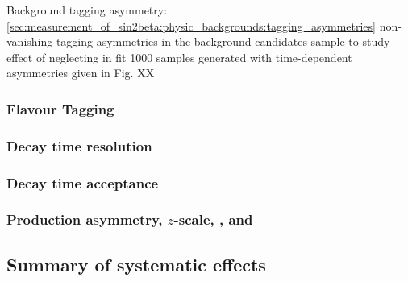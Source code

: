 Background tagging asymmetry:
\cf \cref{sec:measurement_of_sin2beta:physic_backgrounds:tagging_asymmetries}
non-vanishing tagging asymmetries in the background candidates sample
\ToyMC to study effect of neglecting in fit
1000 samples generated with time-dependent asymmetries given in Fig. XX

\subsubsection{Flavour Tagging}
\label{sec:measurement_of_sin2beta:systematics:systematics:tagging}

\subsubsection{Decay time resolution}
\label{sec:measurement_of_sin2beta:systematics:systematics:resolution}

\subsubsection{Decay time acceptance}
\label{sec:measurement_of_sin2beta:systematics:systematics:acceptance}

\subsubsection{Production asymmetry, $z$-scale, \DMd, and \DG}
\label{sec:measurement_of_sin2beta:systematics:systematics:further_studies}

\subsection{Summary of systematic effects}
\label{sec:measurement_of_sin2beta:systematics:summary}
